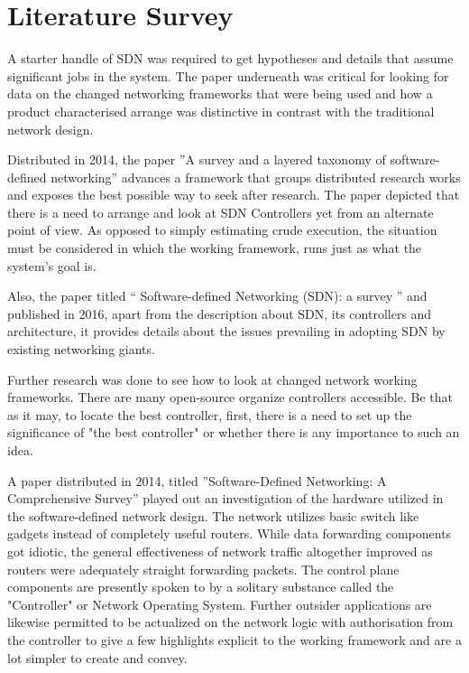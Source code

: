 \chapter{Literature Survey}

A starter handle of SDN was required to get hypotheses and details that assume significant jobs in the system. The paper underneath was critical for looking for data on the changed networking frameworks that were being used and how a product characterised arrange was distinctive in contrast with the traditional network design.

Distributed in 2014, the paper ''A survey and a layered taxonomy of software-defined networking'' \cite{taxonomy2014} advances a framework that groups distributed research works and exposes the best possible way to seek after research. The paper depicted that there is a need to arrange and look at SDN Controllers yet from an alternate point of view. As opposed to simply estimating crude execution, the situation must be considered in which the working framework, runs just as what the system's goal is.

Also, the paper titled `` Software-defined Networking (SDN): a survey ''\cite{benzekki2016survey} and published in 2016, apart from the description about SDN, its controllers and architecture, it provides details about the issues prevailing in adopting SDN by existing networking giants.

Further research was done to see how to look at changed network working frameworks. There are many open-source organize controllers accessible. Be that as it may, to locate the best controller, first, there is a need to set up the significance of "the best controller" or whether there is any importance to such an idea.

A paper distributed in 2014, titled ''Software-Defined Networking: A Comprehensive Survey'' \cite{Survey2014} played out an investigation of the hardware utilized in the software-defined network design. The network utilizes basic switch like gadgets instead of completely useful routers. While data forwarding components got idiotic, the general effectiveness of network traffic altogether improved as routers were adequately straight forwarding packets. The control plane components are presently spoken to by a solitary substance called the "Controller" or Network Operating System. Further outsider applications are likewise permitted to be actualized on the network logic with authorisation from the controller to give a few highlights explicit to the working framework and are a lot simpler to create and convey.

